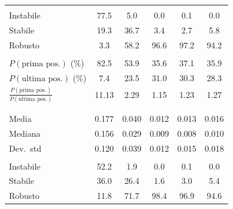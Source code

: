 \documentclass[../relazione.tex]{subfiles}
\begin{document}
\begin{xltabular}{\textwidth}{X *{5}{c}}
  \\
 \hspace{1em}Instabile & 77.5 & 5.0 & 0.0 & 0.1 & 0.0 \\
 \hspace{1em}Stabile & 19.3 & 36.7 & 3.4 & 2.7 & 5.8 \\
 \hspace{1em}Robusto & 3.3 & 58.2 & 96.6 & 97.2 & 94.2 \\

  \\
 \hspace{1em}$P(\text{prima pos.})$ (\%) & 82.5 & 53.9 & 35.6 & 37.1 & 35.9 \\
 \hspace{1em}$P(\text{ultima pos.})$ (\%) & 7.4 & 23.5 & 31.0 & 30.3 & 28.3 \\
 \hspace{1em}$\frac{P(\text{prima pos.})}{P(\text{ultima pos.})}$ & 11.13 & 2.29 & 1.15 & 1.23 & 1.27 \\

  \\
  \\
 \hspace{1em}Media & 0.177 & 0.040 & 0.012 & 0.013 & 0.016 \\
 \hspace{1em}Mediana & 0.156 & 0.029 & 0.009 & 0.008 & 0.010 \\
 \hspace{1em}Dev.\ std & 0.120 & 0.039 & 0.012 & 0.015 & 0.018 \\

  \\
 \hspace{1em}Instabile & 52.2 & 1.9 & 0.0 & 0.1 & 0.0 \\
 \hspace{1em}Stabile & 36.0 & 26.4 & 1.6 & 3.0 & 5.4 \\
 \hspace{1em}Robusto & 11.8 & 71.7 & 98.4 & 96.9 & 94.6 \\


\end{xltabular}
\end{document}
